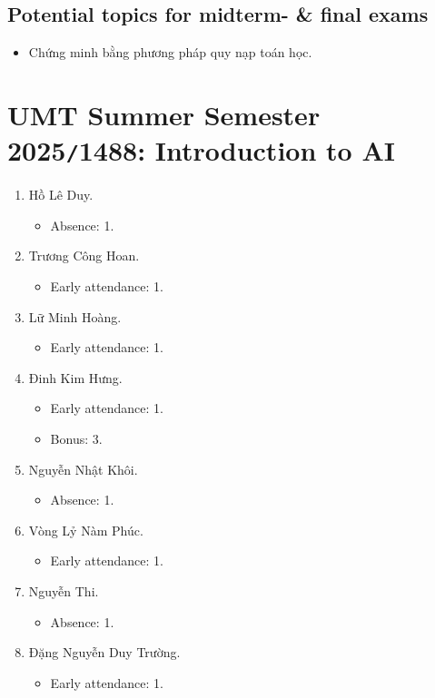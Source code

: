 \documentclass{article}
\begin{document}

\subsection{Potential topics for midterm- \& final exams}

\begin{itemize}
	\item Chứng minh bằng phương pháp quy nạp toán học.
\end{itemize}



\section{UMT Summer Semester 2025{\tt/}1488: Introduction to AI}

\begin{enumerate}
	\item {\sc Hồ Lê Duy.}
	\begin{itemize}
		\item Absence: 1.
	\end{itemize}
	\item {\sc Trương Công Hoan.}
	\begin{itemize}
		\item Early attendance: 1.
	\end{itemize}
	\item {\sc Lữ Minh Hoàng.}
	\begin{itemize}
		\item Early attendance: 1.
	\end{itemize}
	\item {\sc Đinh Kim Hưng.}
	\begin{itemize}
		\item Early attendance: 1.
		\item Bonus: 3.
	\end{itemize}
	\item {\sc Nguyễn Nhật Khôi.}
	\begin{itemize}
		\item Absence: 1.
	\end{itemize}
	\item {\sc Vòng Lỷ Nàm Phúc.}
	\begin{itemize}
		\item Early attendance: 1.
	\end{itemize}
	\item {\sc Nguyễn Thi.}
	\begin{itemize}
		\item Absence: 1.
	\end{itemize}
	\item {\sc Đặng Nguyễn Duy Trường.}
	\begin{itemize}
		\item Early attendance: 1.
	\end{itemize}
\end{enumerate}
\end{document}
